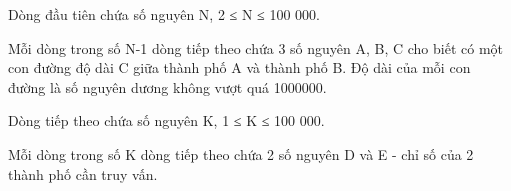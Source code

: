 Dòng đầu tiên chứa số nguyên N, 2 ≤ N ≤ 100 000.  

   Mỗi dòng trong số N-1 dòng tiếp theo chứa 3 số nguyên A, B, C cho biết có một con đường độ dài C giữa thành phố A và thành phố B. Độ dài của mỗi con đường là số nguyên dương không vượt quá 1000000.  

   Dòng tiếp theo chứa số nguyên K, 1 ≤ K ≤ 100 000.  

   Mỗi dòng trong số K dòng tiếp theo chứa 2 số nguyên D và E - chỉ số của 2 thành phố cần truy vấn.  

\